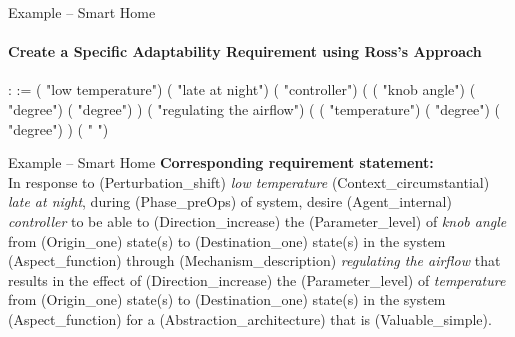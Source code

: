 \documentclass[xcolor=x11names,compress]{beamer}
\renewcommand{\(}{\begin{columns}}
\renewcommand{\)}{\end{columns}}
\newcommand{\<}[1]{\begin{column}{#1}}
\renewcommand{\>}{\end{column}}
\begin{document}

\begin{frame}{Example -- Smart Home}
\begin{coqdoccode}
\framesubtitle{Create a Specific Adaptability Requirement using Ross's Approach}
\small{
\coqdocnoindent
{}  :  := \coqdoceol
\coqdocindent{1.00em}
 \coqdoceol
\coqdocindent{2.00em}
( "low temperature")\coqdoceol
\coqdocindent{2.00em}
( "late at night")\coqdoceol
\coqdocindent{2.00em}
 \coqdoceol
\coqdocindent{2.00em}
( "controller")\coqdoceol
\coqdocindent{2.00em}
(  ( "knob angle") ( "degree") ( "degree") )\coqdoceol
\coqdocindent{2.00em}
( "regulating the airflow") \coqdoceol
\coqdocindent{2.00em}
( ( "temperature") ( "degree") ( "degree") )\coqdoceol
\coqdocindent{2.00em}
( " ")\coqdoceol
\coqdocindent{2.00em}
 \coqdoceol
\coqdocemptyline
}
\end{coqdoccode}
\end{frame}

\begin{frame}{Example -- Smart Home}
\small{
\textbf{Corresponding requirement statement:}\\
In response to (Perturbation\_shift) \emph{low temperature} (Context\_circumstantial) \emph{late at night}, during (Phase\_preOps) of system, desire (Agent\_internal) \emph{controller} to be able to (Direction\_increase) the (Parameter\_level) of \emph{knob angle} from (Origin\_one) state(s) to (Destination\_one) state(s) in the system (Aspect\_function) through (Mechanism\_description) \emph{regulating the airflow} that results in the effect of (Direction\_increase) the (Parameter\_level) of \emph{temperature} from (Origin\_one) state(s) to (Destination\_one) state(s) in the system (Aspect\_function) for a (Abstraction\_architecture) that is (Valuable\_simple).
}
\end{frame}
\end{document}
